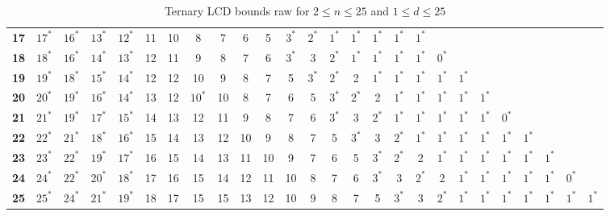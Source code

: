 \begin{table}
\begin{tabular}{|c| c c c c c c c c c c c c c c c c c c c c c c c c c |}
\textbf{17} & $17^*$ & $16^*$ & $13^*$ & $12^*$ & 11 & 10 & 8 & 7 & 6 & 5 & $3^*$ & $2^*$ & $1^*$ & $1^*$ & $1^*$ & $1^*$ & $1^*$ & & & & & & & & \\
\textbf{18} & $18^*$ & $16^*$ & $14^*$ & $13^*$ & 12 & 11 & 9 & 8 & 7 & 6 & $3^*$ & 3 & $2^*$ & $1^*$ & $1^*$ & $1^*$ & $1^*$ & $0^*$ & & & & & & & \\
\textbf{19} & $19^*$ & $18^*$ & $15^*$ & $14^*$ & 12 & 12 & 10 & 9 & 8 & 7 & 5 & $3^*$ & $2^*$ & 2 & $1^*$ & $1^*$ & $1^*$ & $1^*$ & $1^*$ & & & & & & \\
\textbf{20} & $20^*$ & $19^*$ & $16^*$ & $14^*$ & 13 & 12 & $10^*$ & 10 & 8 & 7 & 6 & 5 & $3^*$ & $2^*$ & 2 & $1^*$ & $1^*$ & $1^*$ & $1^*$ & $1^*$ & & & & & \\
\textbf{21} & $21^*$ & $19^*$ & $17^*$ & $15^*$ & 14 & 13 & 12 & 11 & 9 & 8 & 7 & 6 & $3^*$ & 3 & $2^*$ & $1^*$ & $1^*$ & $1^*$ & $1^*$ & $1^*$ & $0^*$ & & & & \\
\textbf{22} & $22^*$ & $21^*$ & $18^*$ & $16^*$ & 15 & 14 & 13 & 12 & 10 & 9 & 8 & 7 & 5 & $3^*$ & 3 & $2^*$ & $1^*$ & $1^*$ & $1^*$ & $1^*$ & $1^*$ & $1^*$ & & & \\
\textbf{23} & $23^*$ & $22^*$ & $19^*$ & $17^*$ & 16 & 15 & 14 & 13 & 11 & 10 & 9 & 7 & 6 & 5 & $3^*$ & $2^*$ & 2 & $1^*$ & $1^*$ & $1^*$ & $1^*$ & $1^*$ & $1^*$ & & \\
\textbf{24} & $24^*$ & $22^*$ & $20^*$ & $18^*$ & 17 & 16 & 15 & 14 & 12 & 11 & 10 & 8 & 7 & 6 & $3^*$ & 3 & $2^*$ & 2 & $1^*$ & $1^*$ & $1^*$ & $1^*$ & $1^*$ & $0^*$ & \\
\textbf{25} & $25^*$ & $24^*$ & $21^*$ & $19^*$ & 18 & 17 & 15 & 15 & 13 & 12 & 10 & 9 & 8 & 7 & 5 & $3^*$ & 3 & $2^*$ & $1^*$ & $1^*$ & $1^*$ & $1^*$ & $1^*$ & $1^*$ & $1^*$ \\
\hline
\end{tabular}
\caption{Ternary LCD bounds raw for $2 \leq n \leq 25$ and $1 \leq d \leq 25$}
\label{tab:lp_tables_q3_2_25_1_25}
\end{table}